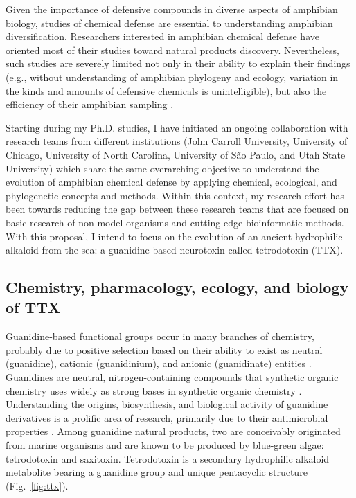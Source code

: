 Given the importance of defensive compounds in diverse aspects of amphibian biology, studies of chemical defense are essential to understanding amphibian diversification. Researchers interested in amphibian chemical defense have oriented most of their studies toward natural products discovery. Nevertheless, such studies are severely limited not only in their ability to explain their findings (e.g., without understanding of amphibian phylogeny and ecology, variation in the kinds and amounts of defensive chemicals is unintelligible), but also the efficiency of their amphibian sampling \citep[e.g., phylogenetic trees provide roadmaps for natural products discovery; e.g.,~][]{smith2006venom}.

Starting during my Ph.D. studies, I have initiated an ongoing collaboration with research teams from different institutions (John Carroll University, University of Chicago, University of North Carolina, University of São Paulo, and Utah State University) which share the same overarching objective to understand the evolution of amphibian chemical defense by applying chemical, ecological, and phylogenetic concepts and methods. Within this context, my research effort has been towards reducing the gap between these research teams that are focused on basic research of non-model organisms and cutting-edge bioinformatic methods. With this proposal, I intend to focus on the evolution of an ancient hydrophilic alkaloid from the sea: a guanidine-based neurotoxin called tetrodotoxin (TTX).

\subsection{Chemistry, pharmacology, ecology, and biology of TTX}

Guanidine-based functional groups occur in many branches of chemistry, probably due to positive selection based on their ability to exist as neutral (guanidine), cationic (guanidinium), and anionic (guanidinate) entities \citep{tan2014chemistry}. Guanidines are neutral, nitrogen-containing compounds that synthetic organic chemistry uses widely as strong bases in synthetic organic chemistry \citep{berlinck2016chemistry}. Understanding the origins, biosynthesis, and biological activity of guanidine derivatives is a prolific area of research, primarily due to their antimicrobial properties \citep{zamperini2017identification}. Among guanidine natural products, two are conceivably originated from marine organisms and are known to be produced by blue-green algae: tetrodotoxin and saxitoxin. Tetrodotoxin is a secondary hydrophilic alkaloid metabolite bearing a guanidine group and unique pentacyclic structure (Fig.~\ref{fig:ttx}). 

